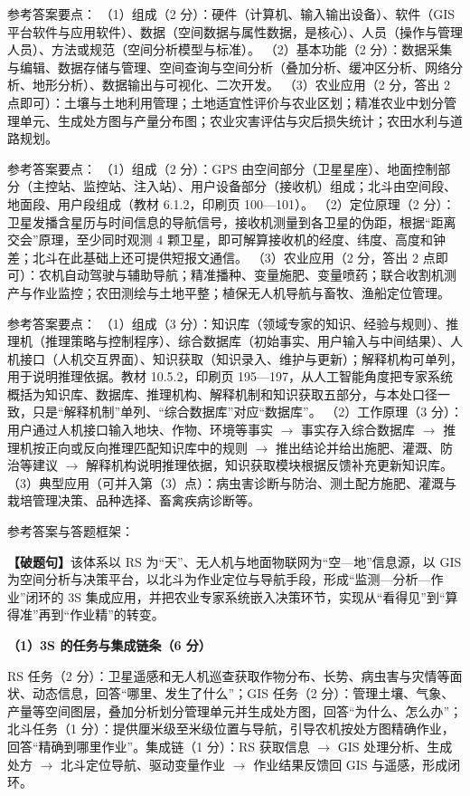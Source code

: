 \documentclass[a4paper,11pt]{article}
\begin{document}
\q 参考答案要点：
（1）组成（2 分）：硬件（计算机、输入输出设备）、软件（GIS 平台软件与应用软件）、数据（空间数据与属性数据，是核心）、人员（操作与管理人员）、方法或规范（空间分析模型与标准）。
（2）基本功能（2 分）：数据采集与编辑、数据存储与管理、空间查询与空间分析（叠加分析、缓冲区分析、网络分析、地形分析）、数据输出与可视化、二次开发。
（3）农业应用（2 分，答出 2 点即可）：土壤与土地利用管理；土地适宜性评价与农业区划；精准农业中划分管理单元、生成处方图与产量分布图；农业灾害评估与灾后损失统计；农田水利与道路规划。

\q 参考答案要点：
（1）组成（2 分）：GPS 由空间部分（卫星星座）、地面控制部分（主控站、监控站、注入站）、用户设备部分（接收机）组成；北斗由空间段、地面段、用户段组成（教材 6.1.2，印刷页 100—101）。
（2）定位原理（2 分）：卫星发播含星历与时间信息的导航信号，接收机测量到各卫星的伪距，根据“距离交会”原理，至少同时观测 4 颗卫星，即可解算接收机的经度、纬度、高度和钟差；北斗在此基础上还可提供短报文通信。
（3）农业应用（2 分，答出 2 点即可）：农机自动驾驶与辅助导航；精准播种、变量施肥、变量喷药；联合收割机测产与作业监控；农田测绘与土地平整；植保无人机导航与畜牧、渔船定位管理。

\q 参考答案要点：
（1）组成（3 分）：知识库（领域专家的知识、经验与规则）、推理机（推理策略与控制程序）、综合数据库（初始事实、用户输入与中间结果）、人机接口（人机交互界面）、知识获取（知识录入、维护与更新）；解释机构可单列，用于说明推理依据。教材 10.5.2，印刷页 195—197，从人工智能角度把专家系统概括为知识库、数据库、推理机构、解释机制和知识获取五部分，与本处口径一致，只是“解释机制”单列、“综合数据库”对应“数据库”。
（2）工作原理（3 分）：用户通过人机接口输入地块、作物、环境等事实 $\rightarrow$ 事实存入综合数据库 $\rightarrow$ 推理机按正向或反向推理匹配知识库中的规则 $\rightarrow$ 推出结论并给出施肥、灌溉、防治等建议 $\rightarrow$ 解释机构说明推理依据，知识获取模块根据反馈补充更新知识库。
（3）典型应用（可并入第（3）点）：病虫害诊断与防治、测土配方施肥、灌溉与栽培管理决策、品种选择、畜禽疾病诊断等。


\q 参考答案与答题框架：

\textbf{【破题句】}该体系以 RS 为“天”、无人机与地面物联网为“空—地”信息源，以 GIS 为空间分析与决策平台，以北斗为作业定位与导航手段，形成“监测—分析—作业”闭环的 3S 集成应用，并把农业专家系统嵌入决策环节，实现从“看得见”到“算得准”再到“作业精”的转变。

\textbf{（1）3S 的任务与集成链条（6 分）}
\begin{analysis}
RS 任务（2 分）：卫星遥感和无人机巡查获取作物分布、长势、病虫害与灾情等面状、动态信息，回答“哪里、发生了什么”；GIS 任务（2 分）：管理土壤、气象、产量等空间图层，叠加分析划分管理单元并生成处方图，回答“为什么、怎么办”；北斗任务（1 分）：提供厘米级至米级位置与导航，引导农机按处方图精确作业，回答“精确到哪里作业”。集成链（1 分）：RS 获取信息 $\rightarrow$ GIS 处理分析、生成处方 $\rightarrow$ 北斗定位导航、驱动变量作业 $\rightarrow$ 作业结果反馈回 GIS 与遥感，形成闭环。
\end{analysis}
\end{document}
